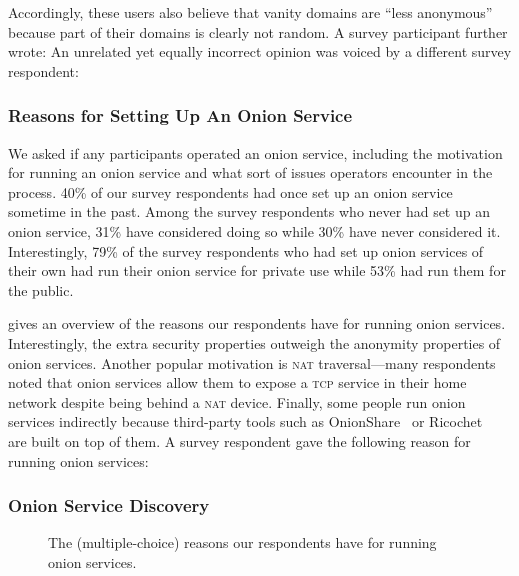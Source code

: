 Accordingly, these users also believe that vanity domains  are ``less anonymous''
because part of their domains is clearly not random.  A survey participant
further wrote:   An unrelated yet
equally incorrect opinion was voiced by a different survey respondent:

\subsubsection{Reasons for Setting Up An Onion Service}
We asked if any participants operated an onion service, including the motivation for
running an onion service and what sort of issues operators encounter in the
process.  40\% of our survey respondents had once set up an onion service sometime in the past.  Among the survey
respondents who never had set up an onion service, 31\% have considered doing so while 30\% have never
considered it.  Interestingly, 79\% of the survey respondents who had set up onion services of their own had run their onion service for
private use while 53\% had run them for the public.

 gives an overview of the reasons our
respondents have for running onion services.  Interestingly, the extra security
properties outweigh the anonymity properties of onion services.  Another popular
motivation is \textsc{nat} traversal---many respondents noted that onion
services allow them to expose a \textsc{tcp} service in their home network
despite being behind a \textsc{nat} device.  Finally, some people run onion
services indirectly because third-party tools such as
OnionShare~\cite{onionshare} or Ricochet~\cite{ricochet} are built on top of
them.  A survey respondent gave the following reason for running onion services:

\subsubsection{Onion Service Discovery}
\begin{figure}[t]
    \centering
    
    \caption{The (multiple-choice) reasons our respondents have for running
    onion services.}
    \label{fig:onion-operation-reasons}
\end{figure}


